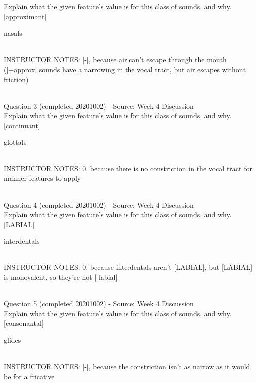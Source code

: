 \documentclass[12pt]{article}
\begin{document}
Explain what the given feature’s value is for this class of sounds, and why.\\

{[approximant]}

nasals


~\\
INSTRUCTOR NOTES: [-], because air can't escape through the mouth ([+approx] sounds have a narrowing in the vocal tract, but air escapes without friction)


~\\

{\large Question 3} (completed 20201002) - Source: Week 4 Discussion\\

Explain what the given feature’s value is for this class of sounds, and why.\\

{[continuant]}

glottals


~\\
INSTRUCTOR NOTES: 0, because there is no constriction in the vocal tract for manner features to apply


~\\

{\large Question 4} (completed 20201002) - Source: Week 4 Discussion\\

Explain what the given feature’s value is for this class of sounds, and why.\\

{[LABIAL]}

interdentals


~\\
INSTRUCTOR NOTES: 0, because interdentals aren't [LABIAL], but [LABIAL] is monovalent, so they're not [-labial]


~\\

{\large Question 5} (completed 20201002) - Source: Week 4 Discussion\\

Explain what the given feature’s value is for this class of sounds, and why.\\

{[consonantal]}

glides


~\\
INSTRUCTOR NOTES: [-], because the constriction isn't as narrow as it would be for a fricative


~\\
\end{document}
